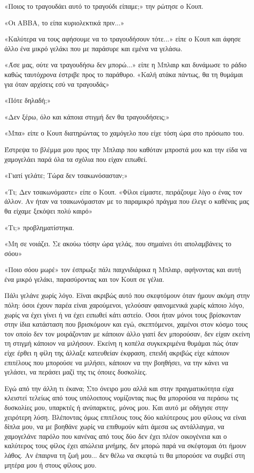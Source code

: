 \documentclass[12pt,twoside, openany]{book}
\begin{document}
«Ποιος το τραγουδάει αυτό το τραγούδι είπαμε;» την ρώτησε ο Κουπ.

«Οι ABBA, το είπα κυριολεκτικά πριν...»

«Καλύτερα να τους αφήσουμε να το τραγουδήσουν τότε...» είπε ο Κουπ και άφησε άλλο ένα μικρό γελάκι που με παράσυρε και εμένα να γελάσω.

«Άσε μας, ούτε να τραγουδήσω δεν μπορώ...» είπε η Μπλαιρ και δυνάμωσε το ράδιο καθώς ταυτόχρονα έστριβε προς το παράθυρο. «Καλή ατάκα πάντως, θα τη θυμάμαι για όταν αρχίσεις εσύ να τραγουδάς»

«Πότε δηλαδή;»

«Δεν ξέρω, όλο και κάποια στιγμή δεν θα τραγουδήσεις;»

«Μπα» είπε ο Κουπ διατηρώντας το χαμόγελο που είχε τόση ώρα στο πρόσωπο του.

Έστρεψα το βλέμμα μου προς την Μπλαιρ που καθόταν μπροστά μου και την είδα να χαμογελάει παρά όλα τα σχόλια που είχαν ειπωθεί.

«Γιατί γελάτε; Τώρα δεν τσακωνόσασταν;»

«Τι; Δεν τσακωνόμαστε» είπε ο Κουπ. «Φίλοι είμαστε, πειράζουμε λίγο ο ένας τον άλλον. Αν ήταν να τσακωνόμασταν με το παραμικρό πράγμα που έλεγε ο καθένας μας θα είχαμε ξεκόψει πολύ καιρό»

«Τι;» προβληματίστηκα.

«Μη σε νοιάζει. Σε ακούω τόσην ώρα γελάς, που σημαίνει ότι απολαμβάνεις το σόου»

«Ποιο σόου μωρέ» τον έσπρωξε πάλι παιχνιδιάρικα η Μπλαιρ, αφήνοντας και αυτή ένα μικρό γελάκι, παρασύροντας και τον Κουπ σε γέλια.

Πάλι γελάνε χωρίς λόγο. Είναι ακριβώς αυτό που σκεφτόμουν όταν ήμουν ακόμη στην πόλη: όσοι έχουν παρέα είναι χαρούμενοι, γελούσαν φαινομενικά χωρίς κάποιο λόγο, χωρίς να έχει γίνει ή να έχει ειπωθεί κάτι αστείο. Όσοι ήταν μόνοι τους βρίσκονταν στην ίδια κατάσταση που βρισκόμουν και εγώ, σκεπτόμενοι, χαμένοι στον κόσμο τους τον οποίο δεν τον μοιράζονταν με κάποιον άλλο γιατί δεν μπορούσαν, δεν είχαν εκείνη τη στιγμή κάποιον να μιλήσουν. Εκείνη η κοπέλα συγκεκριμένα θυμάμαι πώς όταν είχε έρθει η φίλη της άλλαξε κατευθείαν έκφραση, επειδή ακριβώς είχε κάποιον επιτέλους που μπορούσε να μιλήσει, κάποιον να την βοηθήσει, να την κάνει να γελάσει, να περάσει μαζί της τις όποιες δυσκολίες.

Εγώ από την άλλη τι έκανα; Στο όνειρο μου αλλά και στην πραγματικότητα είχα κλειστεί τελείως από τους υπόλοιπους νομίζοντας πως θα μπορούσα να περάσω τις δυσκολίες μου, υπαρκτές ή ανύπαρκτες, μόνος μου. Και αυτό με οδήγησε στην χειρότερη λύση. Βλέποντας όμως επιτέλους τους δύο καλύτερους μου φίλους να είναι δίπλα μου, να με βοηθάνε χωρίς να επιθυμούν κάτι άμεσα ως αντάλλαγμα, να χαμογελάνε παρόλο που κανένας από τους δύο δεν έχει πλέον οικογένεια και ο καλύτερος τους φίλος έχει απώλεια μνήμης, δεν μπορώ παρά να σκέφτομαι ότι ήμουν λάθος. Αν έπαιρνα τη ζωή μου... δεν θέλω να σκεφτώ τι θα μπορούσε να συμβεί στη μητέρα μου ή στους φίλους μου.
\end{document}
